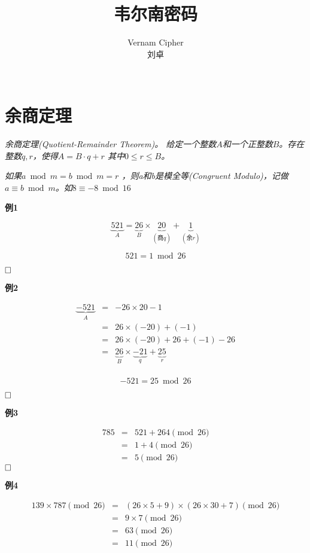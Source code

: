 \documentclass{article}
\date{}
\title{韦尔南密码}
\author{
Vernam Cipher\\
 刘卓\\
 \texttt{ } \\
}
\begin{document}
\maketitle

\section{余商定理}
\textit{余商定理(Quotient-Remainder Theorem)。 给定一个整数$A$和一个正整数$B$。存在整数$q,r$，使得$
A=B \cdot q+r$ 其中$0 \leq r \leq B$。}

\textit{如果$a \bmod m = b \bmod m = r$ ，则a和b是模全等(Congruent Modulo)，记做$a \equiv b \bmod m$。如$8 \equiv -8 \bmod 16$}



\textbf{例1}

$$ \underbrace{521}_{A}=  \underbrace{26}_{B} \times  \underbrace{20}_{(\mbox{商}q)} +\underbrace{1}_{(\mbox{余}r)}
$$

$$521 = 1 \bmod 26$$ 

$\hfill\square$ 

\textbf{例2}

\begin{eqnarray}   
\label{eq}
\underbrace{-521}_{A}&=& -26 \times 20 -1 \nonumber \\ 
&=& 26 \times (-20) +  (-1)  \nonumber \\ 
&=& 26 \times (-20) + 26 + (-1) -26 \nonumber \\ 
&=& \underbrace{26}_{B} \times \underbrace{-21}_{q} + \underbrace{25}_{r}\nonumber \\
\nonumber 
\end{eqnarray}

$$-521 = 25 \bmod 26$$ 

$\hfill\square$ 

\textbf{例3}

\begin{eqnarray}   
\label{eq}
785  &=& 521 + 264 \pmod{26} \nonumber \\ 
&=& 1 +4 \pmod{26} \nonumber \\ 
&=& 5 \pmod{26}
\nonumber 
\end{eqnarray} 
$\hfill\square$ 

\clearpage


\textbf{例4}

\begin{eqnarray}   
\label{eq}
139 \times 787 \pmod{26} &=& (26 \times 5 + 9) \times   (26 \times 30 + 7) \pmod{26} \nonumber \\ 
&=& 9 \times 7 \pmod{26} \nonumber \\ 
&=& 63\pmod{26} \nonumber \\ 
&=& 11 \pmod{26}
\nonumber 
\end{eqnarray}
\end{document}

